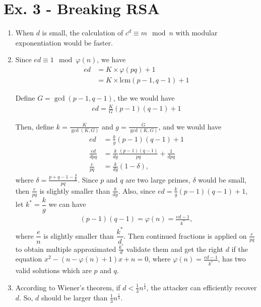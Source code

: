 \documentclass[11pt,a4paper]{article}
\begin{document}
\section*{Ex. 3 - Breaking RSA}
\begin{enumerate}
\item When $d$ is small, the calculation of $c^{d} \equiv m \mod n$ with modular exponentiation would be faster.

\item Since $ed \equiv 1 \mod \varphi(n)$, we have
\begin{align*}
	ed &= K \times \varphi(pq) + 1 \\
	&= K \times \mathrm{lcm}(p-1, q-1) + 1
\end{align*}
\par Define $G = \gcd(p-1,q-1)$, the we would have
\begin{align*}
	ed = \frac{K}{G}(p-1)(q-1) + 1
\end{align*}
\par Then, define $k = \frac{K}{\gcd(K,G)}$ and $g = \frac{G}{\gcd(K,G)}$, and we would have
\begin{align*}
	ed &= \frac{k}{g}(p-1)(q-1) + 1 \\
	\frac{ed}{dpq} &= \frac{k}{dg}\frac{(p-1)(q-1)}{pq} + \frac{1}{dpq} \\
	\frac{e}{pq} &= \frac{k}{dg}(1-\delta),
\end{align*}
where $\delta = \frac{p + q - 1 - \frac{g}{k}}{pq}$. Since $p$ and $q$ are two large primes, $\delta$ would be small, then $\frac{e}{pq}$ is slightly smaller than $\frac{k}{dg}$. Also, since $ed = \frac{k}{g}(p-1)(q-1) + 1$, let $k^{*} = \dfrac{k}{g}$ we can have
\begin{align*}
	(p-1)(q-1) = \varphi(n) = \frac{ed-1}{k^{*}},
\end{align*}
where $\dfrac{e}{n}$ is slightly smaller than $\dfrac{k^{*}}{d}$. Then continued fractions is applied on $\frac{e}{pq}$ to obtain multiple approximated $\frac{k^{*}}{d}$ validate them and get the right $d$ if the equation $x^{2} - (n-\varphi(n) + 1)x + n = 0$, where $\varphi(n) = \frac{ed - 1}{k^{*}}$, has two valid solutions which are $p$ and $q$.

\item According to Wiener's theorem, if $d < \frac{1}{3}n^{\frac{1}{4}}$, the attacker can efficiently recover $d$. So, $d$ should be larger than $\frac{1}{3}n^{\frac{1}{4}}$.


\end{enumerate}
\end{document}
